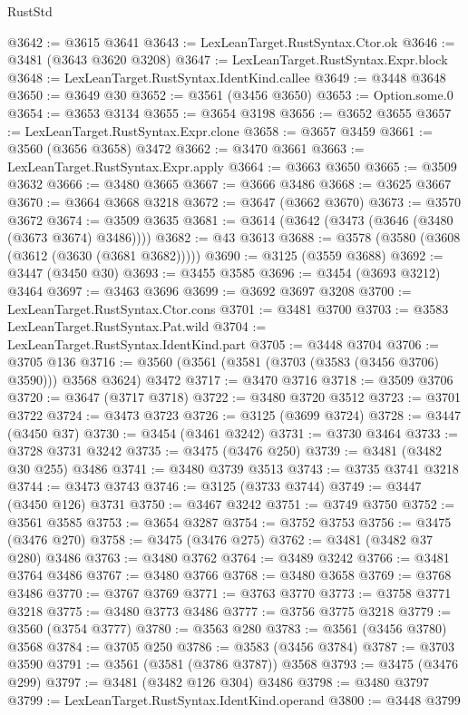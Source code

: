 \begin{lexlean}{RustStd}
\begin{coremodule}
@3642 := @3615 @3641
@3643 := LexLeanTarget.RustSyntax.Ctor.ok
@3646 := @3481 (@3643 @3620 @3208)
@3647 := LexLeanTarget.RustSyntax.Expr.block
@3648 := LexLeanTarget.RustSyntax.IdentKind.callee
@3649 := @3448 @3648
@3650 := @3649 @30
@3652 := @3561 (@3456 @3650)
@3653 := Option.some.{0}
@3654 := @3653 @3134
@3655 := @3654 @3198
@3656 := @3652 @3655
@3657 := LexLeanTarget.RustSyntax.Expr.clone
@3658 := @3657 @3459
@3661 := @3560 (@3656 @3658) @3472
@3662 := @3470 @3661
@3663 := LexLeanTarget.RustSyntax.Expr.apply
@3664 := @3663 @3650
@3665 := @3509 @3632
@3666 := @3480 @3665
@3667 := @3666 @3486
@3668 := @3625 @3667
@3670 := @3664 @3668 @3218
@3672 := @3647 (@3662 @3670)
@3673 := @3570 @3672
@3674 := @3509 @3635
@3681 := @3614 (@3642 (@3473 (@3646 (@3480 (@3673 @3674) @3486))))
@3682 := @43 @3613
@3688 := @3578 (@3580 (@3608 (@3612 (@3630 (@3681 @3682)))))
@3690 := @3125 (@3559 @3688)
@3692 := @3447 (@3450 @30)
@3693 := @3455 @3585
@3696 := @3454 (@3693 @3212) @3464
@3697 := @3463 @3696
@3699 := @3692 @3697 @3208
@3700 := LexLeanTarget.RustSyntax.Ctor.cons
@3701 := @3481 @3700
@3703 := @3583 LexLeanTarget.RustSyntax.Pat.wild
@3704 := LexLeanTarget.RustSyntax.IdentKind.part
@3705 := @3448 @3704
@3706 := @3705 @136
@3716 := @3560 (@3561 (@3581 (@3703 (@3583 (@3456 @3706) @3590))) @3568 @3624) @3472
@3717 := @3470 @3716
@3718 := @3509 @3706
@3720 := @3647 (@3717 @3718)
@3722 := @3480 @3720 @3512
@3723 := @3701 @3722
@3724 := @3473 @3723
@3726 := @3125 (@3699 @3724)
@3728 := @3447 (@3450 @37)
@3730 := @3454 (@3461 @3242)
@3731 := @3730 @3464
@3733 := @3728 @3731 @3242
@3735 := @3475 (@3476 @250)
@3739 := @3481 (@3482 @30 @255) @3486
@3741 := @3480 @3739 @3513
@3743 := @3735 @3741 @3218
@3744 := @3473 @3743
@3746 := @3125 (@3733 @3744)
@3749 := @3447 (@3450 @126) @3731
@3750 := @3467 @3242
@3751 := @3749 @3750
@3752 := @3561 @3585
@3753 := @3654 @3287
@3754 := @3752 @3753
@3756 := @3475 (@3476 @270)
@3758 := @3475 (@3476 @275)
@3762 := @3481 (@3482 @37 @280) @3486
@3763 := @3480 @3762
@3764 := @3489 @3242
@3766 := @3481 @3764 @3486
@3767 := @3480 @3766
@3768 := @3480 @3658
@3769 := @3768 @3486
@3770 := @3767 @3769
@3771 := @3763 @3770
@3773 := @3758 @3771 @3218
@3775 := @3480 @3773 @3486
@3777 := @3756 @3775 @3218
@3779 := @3560 (@3754 @3777)
@3780 := @3563 @280
@3783 := @3561 (@3456 @3780) @3568
@3784 := @3705 @250
@3786 := @3583 (@3456 @3784)
@3787 := @3703 @3590
@3791 := @3561 (@3581 (@3786 @3787)) @3568
@3793 := @3475 (@3476 @299)
@3797 := @3481 (@3482 @126 @304) @3486
@3798 := @3480 @3797
@3799 := LexLeanTarget.RustSyntax.IdentKind.operand
@3800 := @3448 @3799

\end{coremodule}
\end{lexlean}
